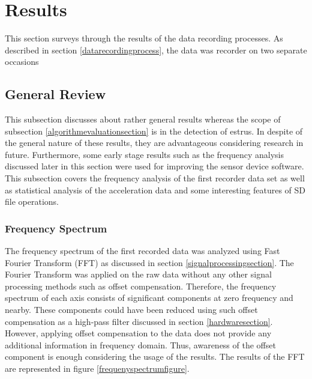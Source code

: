\documentclass[english,12pt,a4paper,pdftex,elec,utf8]{aaltothesis}
\begin{document}
\clearpage

\section{Results} \label{resultssection}
 
This section surveys through the results of the data recording processes. As described in section \ref{datarecordingprocess}, the data was recorder on two separate occasions



\subsection{General Review} \label{generalreviewsection}

This subsection discusses about rather general results whereas the scope of subsection \ref{algorithmevaluationsection} is in the detection of estrus. In despite of the general nature of these results, they are advantageous considering research in future. Furthermore, some early stage results such as the frequency analysis discussed later in this section were used for improving the sensor device software. This subsection covers the frequency analysis of the first recorder data set as well as statistical analysis of the acceleration data and some interesting features of SD file operations. \\






\subsubsection*{Frequency Spectrum}

The frequency spectrum of the first recorded data was analyzed using Fast Fourier Transform (FFT) as discussed in section \ref{signalprocessingsection}. The Fourier Transform was applied on the raw data without any other signal processing methods such as offset compensation. Therefore, the frequency spectrum of each axis consists of significant components at zero frequency and nearby. These components could have been reduced using such offset compensation as a high-pass filter discussed in section \ref{hardwaresection}. However, applying offset compensation to the data does not provide any additional information in frequency domain. Thus, awareness of the offset component is enough considering the usage of the results. The results of the FFT are represented in figure \ref{frequenyspectrumfigure}. \\
\end{document}
